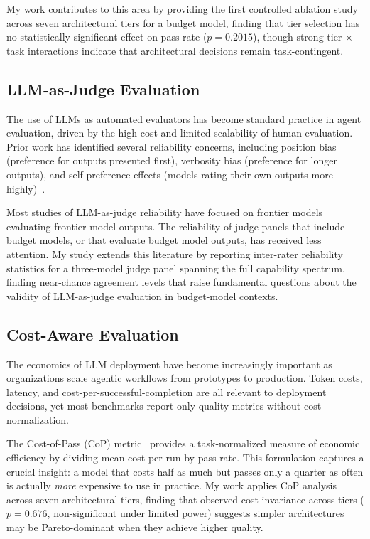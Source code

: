 \documentclass[11pt]{article}
\begin{document}
My work contributes to this area by providing the first controlled ablation
study across seven architectural tiers for a budget model, finding that
tier selection has no statistically significant effect on pass rate
($p=0.2015$), though strong tier $\times$ task interactions indicate that
architectural decisions remain task-contingent.

\subsection{LLM-as-Judge Evaluation}
\label{sec:llm_judge}

The use of LLMs as automated evaluators has become standard practice in agent
evaluation, driven by the high cost and limited scalability of human
evaluation. Prior work has identified several reliability concerns, including
position bias (preference for outputs presented first), verbosity bias
(preference for longer outputs), and self-preference effects (models rating
their own outputs more highly)~\cite{polo2024efficient}.

Most studies of LLM-as-judge reliability have focused on frontier models
evaluating frontier model outputs. The reliability of judge panels that include
budget models, or that evaluate budget model outputs, has received less
attention. My study extends this literature by reporting inter-rater
reliability statistics for a three-model judge panel spanning the full
capability spectrum, finding near-chance agreement levels that raise
fundamental questions about the validity of LLM-as-judge evaluation in
budget-model contexts.

\subsection{Cost-Aware Evaluation}
\label{sec:cost_aware}

The economics of LLM deployment have become increasingly important as
organizations scale agentic workflows from prototypes to production. Token
costs, latency, and cost-per-successful-completion are all relevant to
deployment decisions, yet most benchmarks report only quality metrics without
cost normalization.

The Cost-of-Pass (CoP) metric~\cite{scylla2026dryrun} provides a
task-normalized measure of economic efficiency by dividing mean cost per run
by pass rate. This formulation captures a crucial insight: a model that costs
half as much but passes only a quarter as often is actually \emph{more}
expensive to use in practice. My work applies CoP analysis across seven
architectural tiers, finding that observed cost invariance across tiers
($p=0.676$, non-significant under limited power) suggests simpler
architectures may be Pareto-dominant when they achieve higher quality.
\end{document}
